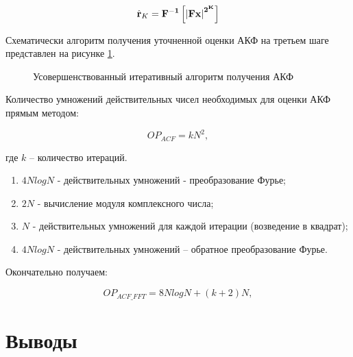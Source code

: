 \begin{center}
\begin{equation}
	\label{eq:akf_3}
	\hat{\bf{r}}_K = \bf{F}^{-1}\left[ \left| \bf{Fx} \right| ^{2^K} \right]
\end{equation}
\end{center}

Схематически алгоритм получения уточненной оценки АКФ на третьем шаге представлен на рисунке \ref{pic:akf_pic}.

\begin{figure}[h]
	\center{}
	\caption{Усовершенствованный итеративный алгоритм получения АКФ}
	\label{pic:akf_pic}
\end{figure}

Количество умножений действительных чисел необходимых для оценки АКФ прямым методом: 
\begin{center}
\begin{equation}
	\label{eq:num_of_op_acf}
	OP_{ACF}=kN^2,
\end{equation}
\end{center}
где ${k}$  – количество итераций.

\begin{enumerate}
\item ${4NlogN}$ - действительных умножений - преобразование Фурье;
\item ${2N}$ - вычисление модуля комплексного числа;
\item ${N}$ - действительных умножений для каждой итерации (возведение в квадрат);
\item ${4NlogN}$ - действительных умножений – обратное преобразование Фурье. 
\end{enumerate}

Окончательно получаем:
\begin{center}
\begin{equation}
	\label{eq:num_of_op_acf}
	OP_{ACF\_FFT}=8NlogN + (k+2)N,
\end{equation}
\end{center}

\section{Выводы}

\clearpage
